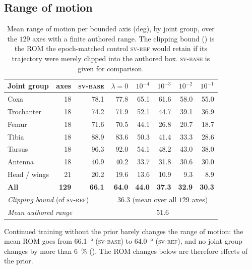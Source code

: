 \documentclass[11pt,a4paper]{article}
\newcommand{\lam}{\lambda}
\newcommand{\armref}{\textsc{sv-ref}}
\newcommand{\armbase}{\textsc{sv-base}}
\begin{document}
\subsection{Range of motion}
\label{sec:res-rom}

\begin{table}[t]
\centering
\small
\caption{Mean range of motion per bounded axis (deg), by joint group, over the
$129$ axes with a finite authored range. The clipping bound () is
the ROM the epoch-matched control \armref{} would retain if its trajectory were
merely clipped into the authored box. \armbase{} is given for comparison.}
\label{tab:rom}
\setlength{\tabcolsep}{4.5pt}
\begin{tabular}{l r r *{5}{r}}
\toprule
Joint group & axes & \armbase{} & $\lam{=}0$ & $10^{-4}$ & $10^{-3}$ & $10^{-2}$ & $10^{-1}$ \\
\midrule
Coxa            & 18 & 78.1 & 77.8 & 65.1 & 61.6 & 58.0 & 55.0 \\
Trochanter      & 18 & 74.2 & 71.9 & 52.1 & 44.7 & 39.1 & 36.9 \\
Femur           & 18 & 71.6 & 70.5 & 44.1 & 26.8 & 20.7 & 18.7 \\
Tibia           & 18 & 88.9 & 83.6 & 50.3 & 41.4 & 33.3 & 28.6 \\
Tarsus          & 18 & 96.3 & 92.0 & 54.1 & 48.2 & 43.0 & 38.0 \\
Antenna         & 18 & 40.9 & 40.2 & 33.7 & 31.8 & 30.6 & 30.0 \\
Head / wings    & 21 & 20.2 & 19.6 & 13.6 & 10.9 &  9.3 &  8.9 \\
\midrule
\textbf{All}    & \textbf{129} & \textbf{66.1} & \textbf{64.0} & \textbf{44.0} & \textbf{37.3} & \textbf{32.9} & \textbf{30.3} \\
\midrule
\multicolumn{3}{l}{\emph{Clipping bound} (of \armref{})} & \multicolumn{5}{c}{$36.3$ (mean over all $129$ axes)} \\
\multicolumn{3}{l}{\emph{Mean authored range}} & \multicolumn{5}{c}{$51.6$} \\
\bottomrule
\end{tabular}
\end{table}

Continued training without the prior barely changes the range of motion: the
mean ROM goes from \SI{66.1}{\degree} (\armbase{}) to \SI{64.0}{\degree}
(\armref{}), and no joint group changes by more than \SI{6}{\percent}
(). The ROM changes below are therefore effects of the prior.
\end{document}
